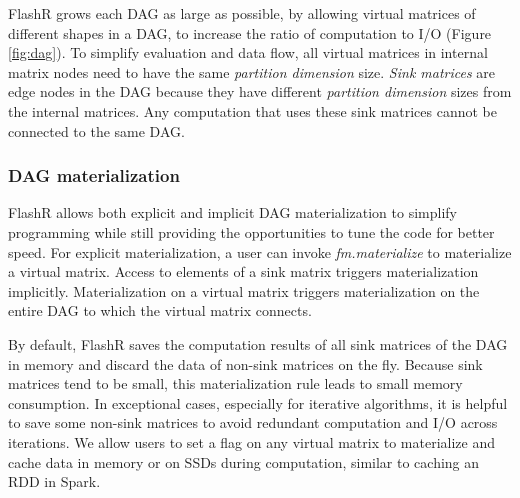 FlashR grows each DAG as large as possible, by allowing virtual matrices
of different shapes in a DAG, to increase the ratio of computation to I/O
(Figure \ref{fig:dag}). To simplify evaluation and data flow, 
all virtual matrices in internal matrix nodes need to have the same
\textit{partition dimension} size. \textit{Sink matrices} are edge nodes
in the DAG because they have different \textit{partition dimension} sizes
from the internal matrices. Any computation that uses these
sink matrices cannot be connected to the same DAG.  

\subsubsection{DAG materialization}
FlashR allows both explicit and implicit DAG materialization to simplify
programming while still providing the opportunities to tune the code for
better speed. For explicit materialization, a user can invoke
\textit{fm.materialize} to materialize a virtual matrix. Access to elements
of a sink matrix triggers materialization implicitly. Materialization on
a virtual matrix triggers materialization on the entire DAG to which the virtual
matrix connects.

By default, FlashR saves the computation results of all sink matrices of
the DAG in memory and discard the data of non-sink matrices on the fly.
Because sink matrices tend to be small, this materialization
rule leads to small memory consumption.
In exceptional cases, especially for iterative algorithms,
it is helpful to save some non-sink matrices to avoid
redundant computation and I/O across iterations.  We allow users to
set a flag on any virtual matrix to materialize and cache data in memory
or on SSDs during computation, similar to caching an RDD in Spark.

